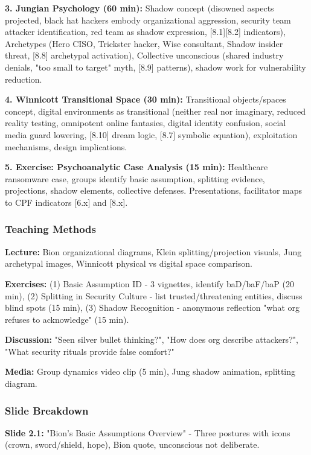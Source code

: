 \documentclass[11pt,a4paper]{article}
\begin{document}
\textbf{3. Jungian Psychology (60 min):} Shadow concept (disowned aspects projected, black hat hackers embody organizational aggression, security team attacker identification, red team as shadow expression, [8.1][8.2] indicators), Archetypes (Hero CISO, Trickster hacker, Wise consultant, Shadow insider threat, [8.8] archetypal activation), Collective unconscious (shared industry denials, "too small to target" myth, [8.9] patterns), shadow work for vulnerability reduction.

\textbf{4. Winnicott Transitional Space (30 min):} Transitional objects/spaces concept, digital environments as transitional (neither real nor imaginary, reduced reality testing, omnipotent online fantasies, digital identity confusion, social media guard lowering, [8.10] dream logic, [8.7] symbolic equation), exploitation mechanisms, design implications.

\textbf{5. Exercise: Psychoanalytic Case Analysis (15 min):} Healthcare ransomware case, groups identify basic assumption, splitting evidence, projections, shadow elements, collective defenses. Presentations, facilitator maps to CPF indicators [6.x] and [8.x].

\subsubsection{Teaching Methods}
\textbf{Lecture:} Bion organizational diagrams, Klein splitting/projection visuals, Jung archetypal images, Winnicott physical vs digital space comparison.

\textbf{Exercises:} (1) Basic Assumption ID - 3 vignettes, identify baD/baF/baP (20 min), (2) Splitting in Security Culture - list trusted/threatening entities, discuss blind spots (15 min), (3) Shadow Recognition - anonymous reflection "what org refuses to acknowledge" (15 min).

\textbf{Discussion:} "Seen silver bullet thinking?", "How does org describe attackers?", "What security rituals provide false comfort?"

\textbf{Media:} Group dynamics video clip (5 min), Jung shadow animation, splitting diagram.

\subsubsection{Slide Breakdown}
\textbf{Slide 2.1:} "Bion's Basic Assumptions Overview" - Three postures with icons (crown, sword/shield, hope), Bion quote, unconscious not deliberate.
\end{document}
